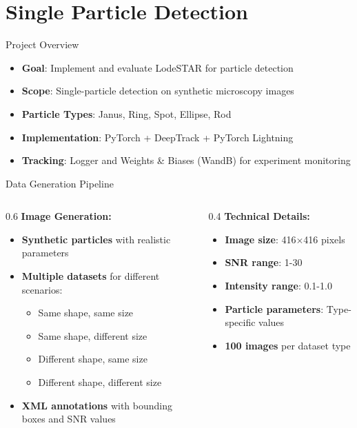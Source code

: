 \section[Single Particle Detection]{Single Particle Detection}

\begin{frame}{Project Overview}
\begin{itemize}
    \item \textbf{Goal}: Implement and evaluate LodeSTAR for particle detection
    \item \textbf{Scope}: Single-particle detection on synthetic microscopy images
    \item \textbf{Particle Types}: Janus, Ring, Spot, Ellipse, Rod
    \item \textbf{Implementation}: PyTorch + DeepTrack + PyTorch Lightning
    \item \textbf{Tracking}: Logger and Weights \& Biases (WandB) for experiment monitoring
\end{itemize}
\end{frame}

\begin{frame}{Data Generation Pipeline}
\begin{columns}
\begin{column}{0.6\textwidth}
\textbf{Image Generation:}
\begin{itemize}
    \item \textbf{Synthetic particles} with realistic parameters
    \item \textbf{Multiple datasets} for different scenarios:
    \begin{itemize}
        \item Same shape, same size
        \item Same shape, different size
        \item Different shape, same size
        \item Different shape, different size
    \end{itemize}
    \item \textbf{XML annotations} with bounding boxes and SNR values
\end{itemize}
\end{column}
\begin{column}{0.4\textwidth}
\textbf{Technical Details:}
\begin{itemize}
    \item \textbf{Image size}: 416$\times$416 pixels
    \item \textbf{SNR range}: 1-30
    \item \textbf{Intensity range}: 0.1-1.0
    \item \textbf{Particle parameters}: Type-specific values
    \item \textbf{100 images} per dataset type
\end{itemize}
\end{column}
\end{columns}
\end{frame}

